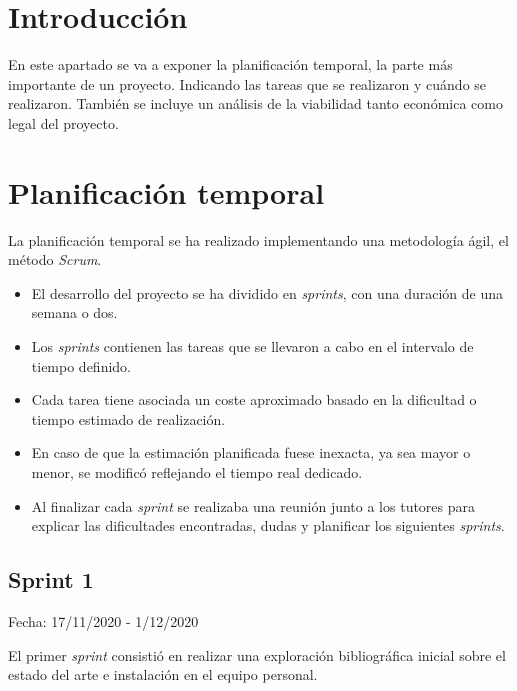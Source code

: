 
\section{Introducción}

En este apartado se va a exponer la planificación temporal, la parte más importante de un proyecto. Indicando las tareas que se realizaron y cuándo se realizaron.  También se incluye un análisis de la viabilidad tanto económica como legal del proyecto.



\section{Planificación temporal}

La planificación temporal se ha realizado implementando una metodología ágil, el método \emph {Scrum}. 

\begin{itemize}

\item El desarrollo del proyecto se ha dividido en \emph {sprints}, con una duración de una semana o dos.

\item Los \emph {sprints} contienen las tareas que se llevaron a cabo en el intervalo de tiempo definido.

\item Cada tarea tiene asociada un coste aproximado basado en la dificultad o tiempo estimado de realización. 

\item En caso de que la estimación planificada fuese inexacta, ya sea mayor o menor, se modificó reflejando el tiempo real dedicado.

\item Al finalizar cada \emph {sprint} se realizaba una reunión junto a los tutores para explicar las dificultades encontradas, dudas y planificar los siguientes \emph {sprints}.

\end{itemize}

\subsection{Sprint 1}

	Fecha: 17/11/2020 - 1/12/2020
	
	El primer \emph {sprint} consistió en realizar una exploración bibliográfica inicial sobre el estado del arte e instalación en el equipo personal. 
	
